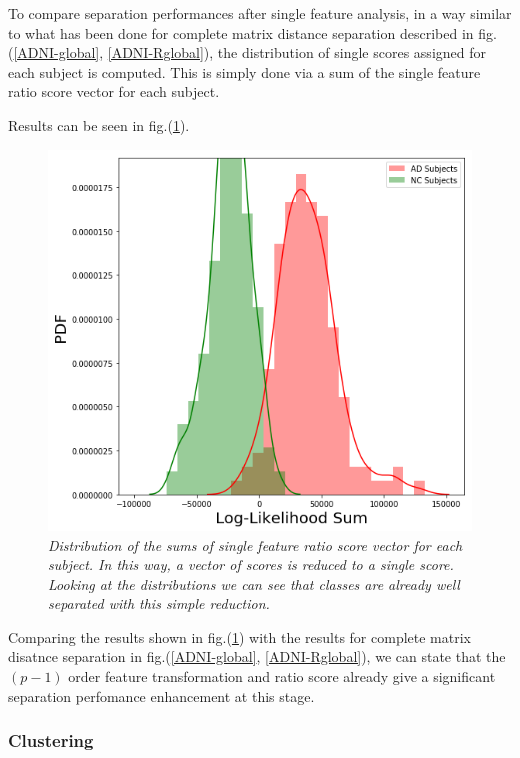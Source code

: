 \documentclass[12pt,openright,twoside,a4paper]{book}
\begin{document}
To compare separation performances after single feature analysis, in a way similar to what has been done for complete matrix distance separation described in fig.(\ref{ADNI-global}, \ref{ADNI-Rglobal}), the distribution of single scores assigned for each subject is computed.
This is simply done via a sum of the single feature ratio score vector for each subject. 

Results can be seen in fig.(\ref{ADNI-sfsum}).

\begin{figure}[!h]
\centering
\includegraphics[scale=0.5]{diff-logpdf-dist}
\caption{\textit{Distribution of the sums of single feature ratio score vector for each subject. In this way, a vector of scores is reduced to a single score. Looking at the distributions we can see that classes are already well separated with this simple reduction.}}
\label{ADNI-sfsum}
\end{figure}

Comparing the results shown in fig.(\ref{ADNI-sfsum}) with the results for complete matrix disatnce separation in fig.(\ref{ADNI-global}, \ref{ADNI-Rglobal}), we can state that the $(p-1)$ order feature transformation and ratio score already give a significant separation perfomance enhancement at this stage.

\subsubsection*{Clustering}
\end{document}

